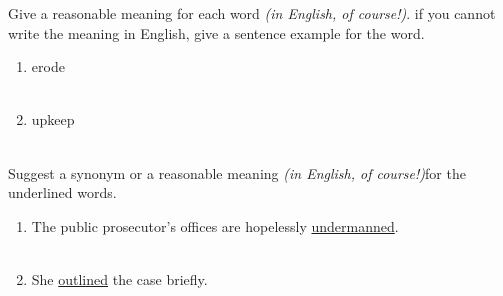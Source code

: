 \documentclass{exam}
\begin{document}
\begin{questions}
\begin{oneparchoices}
\end{oneparchoices}
\question Give a reasonable meaning for each word \emph{(in English, of course!)}. if you cannot write the meaning in English, give a sentence example for the word.\\
\begin{enumerate}
	\item erode \\ \\ 
	\item upkeep \\ \\
\end{enumerate}
\question Suggest a synonym or a reasonable meaning \emph{(in English, of course!)}for the underlined words.\\
\begin{enumerate}
	\item The public prosecutor's offices are hopelessly \underline{undermanned}.\\ \\
	\item She \underline{outlined} the case briefly.\\\\
\end{enumerate}
\end{questions}
\end{document}

